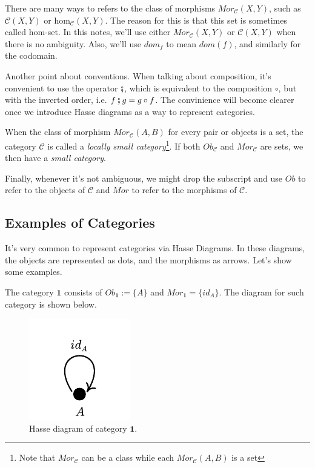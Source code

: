 There are many ways to refers to the class of morphisms $Mor_\mathcal C (X,Y)$, such as
$\mathcal C(X,Y)$ or $\text{hom}_\mathcal C (X,Y)$. The reason for this is that
this set is sometimes called hom-set. In this notes, we'll use either $Mor_\mathcal C (X,Y)$
or $\mathcal C (X,Y)$ when there is no ambiguity. Also, we'll use $dom_f$ to mean $dom(f)$,
and similarly for the codomain.

Another point about conventions. When talking about composition, it's convenient
to use the operator $\fatsemi$, which is equivalent to the composition $\circ$,
but with the inverted order, i.e. $f \fatsemi g = g \circ f$. The convinience
will become clearer once we introduce Hasse diagrams as a way to represent categories.

When the class of morphism $Mor_\mathcal C(A,B)$ for every pair or objects is a set,
the category $\mathcal C$ is called a \textit{locally small category}\footnote{Note
	that $Mor_\mathcal C$ can be a class while each $Mor_\mathcal C(A,B)$ is a set}.
If both $Ob_\mathcal C$ and $Mor_\mathcal C$ are sets, we then have a \textit{small category}.

Finally, whenever it's not ambiguous, we might drop the subscript and use $Ob$
to refer to the objects of $\mathcal C$ and $Mor$ to refer to the morphisms of $\mathcal C$.

\subsection{Examples of Categories}

It's very common to represent categories via Hasse Diagrams. In these diagrams, the
objects are represented as dots, and the morphisms as arrows. Let's show some examples.

\begin{example}[Category $\bm 1$]
	The category $\bm 1$ consists of $Ob_{\bm 1} := \{A\}$ and $Mor_{\bm 1} = \{id_A\}$.
	The diagram for such category is shown below.
	\begin{figure}[H]
		\begin{center}
			\includegraphics{./notebooks/1Cat}
		\end{center}
		\caption{Hasse diagram of category $\bm 1$.}
		\label{fig:1Cat}
	\end{figure}
\end{example}

